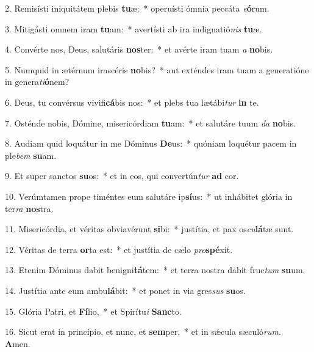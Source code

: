 2. Remisísti iniquitátem plebis \textbf{tu}æ:~*  operuísti ómnia peccáta \textit{e}\textbf{ó}rum.\

3. Mitigásti omnem iram \textbf{tu}am:~*  avertísti ab ira indignatió\textit{nis} \textbf{tu}æ.\

4. Convérte nos, Deus, salutáris \textbf{nos}ter:~*  et avérte iram tuam \textit{a} \textbf{no}bis.\

5. Numquid in ætérnum irascéris \textbf{no}bis?~*  aut exténdes iram tuam a generatióne in genera\textit{ti}\textbf{ó}nem?\

6. Deus, tu convérsus vivifi\textbf{cá}bis nos:~*  et plebs tua lætábi\textit{tur} \textbf{in} te.\

7. Osténde nobis, Dómine, misericórdiam \textbf{tu}am:~*  et salutáre tuum \textit{da} \textbf{no}bis.\

8. Audiam quid loquátur in me Dóminus \textbf{De}us:~*  quóniam loquétur pacem in ple\textit{bem} \textbf{su}am.\

9. Et super sanctos \textbf{su}os:~*  et in eos, qui convertún\textit{tur} \textbf{ad} cor.\

10. Verúmtamen prope timéntes eum salutáre ip\textbf{sí}us:~*  ut inhábitet glória in ter\textit{ra} \textbf{nos}tra.\

11. Misericórdia, et véritas obviavérunt \textbf{si}bi:~*  justítia, et pax os\textit{cu}\textbf{lá}tæ sunt.\

12. Véritas de terra \textbf{or}ta est:~*  et justítia de cælo \textit{pro}\textbf{spé}xit.\

13. Etenim Dóminus dabit benigni\textbf{tá}tem:~*  et terra nostra dabit fruc\textit{tum} \textbf{su}um.\

14. Justítia ante eum ambu\textbf{lá}bit:~*  et ponet in via gres\textit{sus} \textbf{su}os.\

15. Glória Patri, et \textbf{Fí}lio,~*  et Spirítu\textit{i} \textbf{Sanc}to.\

16. Sicut erat in princípio, et nunc, et \textbf{sem}per,~*  et in sǽcula sæculó\textit{rum}. \textbf{A}men.\

